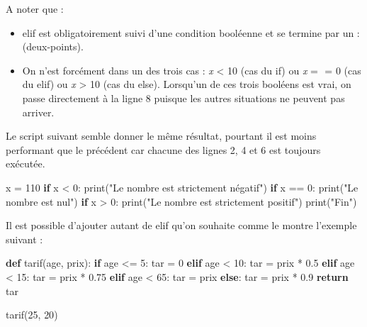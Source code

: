 \documentclass[
  paper=a4,
  ,captions=tableheading
]{scrartcl}
\newenvironment{Shaded}{}{}
\newcommand{\BuiltInTok}[1]{\textcolor[rgb]{0.00,0.50,0.00}{#1}}
\newcommand{\ControlFlowTok}[1]{\textcolor[rgb]{0.00,0.44,0.13}{\textbf{#1}}}
\newcommand{\DecValTok}[1]{\textcolor[rgb]{0.25,0.63,0.44}{#1}}
\newcommand{\FloatTok}[1]{\textcolor[rgb]{0.25,0.63,0.44}{#1}}
\newcommand{\KeywordTok}[1]{\textcolor[rgb]{0.00,0.44,0.13}{\textbf{#1}}}
\newcommand{\NormalTok}[1]{#1}
\newcommand{\OperatorTok}[1]{\textcolor[rgb]{0.40,0.40,0.40}{#1}}
\newcommand{\StringTok}[1]{\textcolor[rgb]{0.25,0.44,0.63}{#1}}
\begin{document}
A noter que :

\begin{itemize}
\item
  elif est obligatoirement suivi d'une condition booléenne et se termine
  par un : (deux-points).
\item
  On n'est forcément dans un des trois cas : \emph{x} \textless{} 10
  (cas du if) ou \emph{x} =  = 0 (cas du elif) ou
  \emph{x} \textgreater{} 10 (cas du else). Lorsqu'un de ces trois
  booléens est vrai, on passe directement à la ligne 8 puisque les
  autres situations ne peuvent pas arriver.
\end{itemize}

Le script suivant semble donner le même résultat, pourtant il est moins
performant que le précédent car chacune des lignes 2, 4 et 6 est
toujours exécutée.

\begin{Shaded}
\begin{Highlighting}[]
\NormalTok{x }\OperatorTok{=} \DecValTok{110}
\ControlFlowTok{if}\NormalTok{ x }\OperatorTok{\textless{}} \DecValTok{0}\NormalTok{:}
    \BuiltInTok{print}\NormalTok{(}\StringTok{"Le nombre est strictement négatif"}\NormalTok{)}
\ControlFlowTok{if}\NormalTok{ x }\OperatorTok{==} \DecValTok{0}\NormalTok{:}
    \BuiltInTok{print}\NormalTok{(}\StringTok{"Le nombre est nul"}\NormalTok{)}
\ControlFlowTok{if}\NormalTok{ x }\OperatorTok{\textgreater{}} \DecValTok{0}\NormalTok{:}
    \BuiltInTok{print}\NormalTok{(}\StringTok{"Le nombre est strictement positif"}\NormalTok{)}
\BuiltInTok{print}\NormalTok{(}\StringTok{"Fin"}\NormalTok{)}
\end{Highlighting}
\end{Shaded}

Il est possible d'ajouter autant de elif qu'on souhaite comme le montre
l'exemple suivant :

\begin{Shaded}
\begin{Highlighting}[]
\KeywordTok{def}\NormalTok{ tarif(age, prix):}
    \ControlFlowTok{if}\NormalTok{ age }\OperatorTok{\textless{}=} \DecValTok{5}\NormalTok{:}
\NormalTok{        tar }\OperatorTok{=} \DecValTok{0}
    \ControlFlowTok{elif}\NormalTok{ age }\OperatorTok{\textless{}} \DecValTok{10}\NormalTok{:}
\NormalTok{        tar }\OperatorTok{=}\NormalTok{ prix }\OperatorTok{*} \FloatTok{0.5}
    \ControlFlowTok{elif}\NormalTok{ age }\OperatorTok{\textless{}} \DecValTok{15}\NormalTok{:}
\NormalTok{        tar }\OperatorTok{=}\NormalTok{ prix }\OperatorTok{*} \FloatTok{0.75}
    \ControlFlowTok{elif}\NormalTok{ age }\OperatorTok{\textless{}} \DecValTok{65}\NormalTok{:}
\NormalTok{        tar }\OperatorTok{=}\NormalTok{ prix}
    \ControlFlowTok{else}\NormalTok{:}
\NormalTok{        tar }\OperatorTok{=}\NormalTok{ prix }\OperatorTok{*} \FloatTok{0.9}
    \ControlFlowTok{return}\NormalTok{ tar}


\NormalTok{tarif(}\DecValTok{25}\NormalTok{, }\DecValTok{20}\NormalTok{)}
\end{Highlighting}
\end{Shaded}
\end{document}
